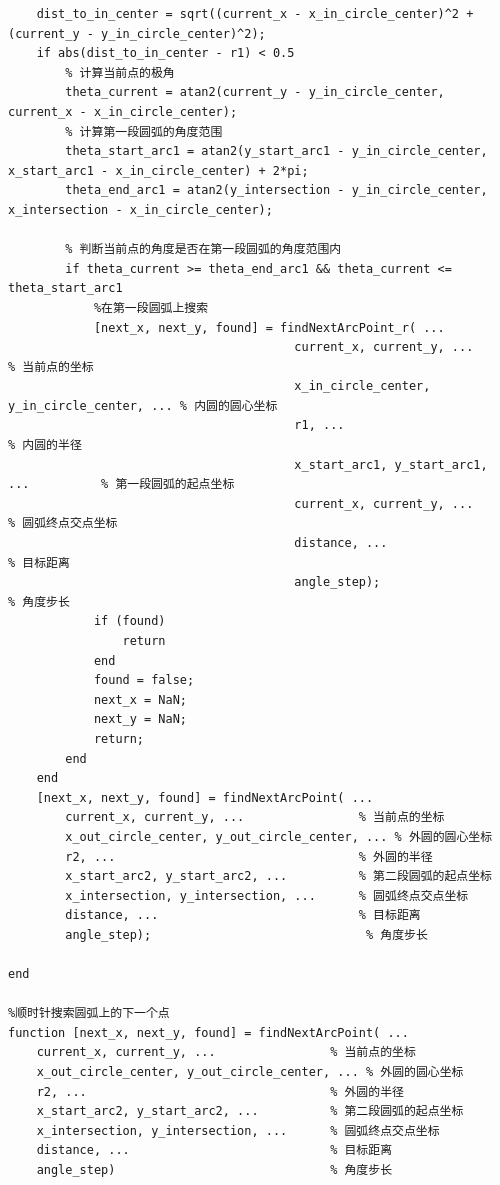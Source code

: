 \documentclass{cumcmthesis1}
\begin{document}
\begin{lstlisting}[caption={求解问题4中-100s到100s位置和速度的代码，并将计算结果保存到result4.xlsx中}, label={lst:eighth_code}]
    % 2. 检查当前点是否位于第一段圆弧上
    dist_to_in_center = sqrt((current_x - x_in_circle_center)^2 + (current_y - y_in_circle_center)^2);
    if abs(dist_to_in_center - r1) < 0.5
        % 计算当前点的极角
        theta_current = atan2(current_y - y_in_circle_center, current_x - x_in_circle_center);
        % 计算第一段圆弧的角度范围
        theta_start_arc1 = atan2(y_start_arc1 - y_in_circle_center, x_start_arc1 - x_in_circle_center) + 2*pi;
        theta_end_arc1 = atan2(y_intersection - y_in_circle_center, x_intersection - x_in_circle_center);

        % 判断当前点的角度是否在第一段圆弧的角度范围内
        if theta_current >= theta_end_arc1 && theta_current <= theta_start_arc1
            %在第一段圆弧上搜索
            [next_x, next_y, found] = findNextArcPoint_r( ...
                                        current_x, current_y, ...                % 当前点的坐标
                                        x_in_circle_center, y_in_circle_center, ... % 内圆的圆心坐标
                                        r1, ...                                  % 内圆的半径
                                        x_start_arc1, y_start_arc1, ...          % 第一段圆弧的起点坐标
                                        current_x, current_y, ...      % 圆弧终点交点坐标
                                        distance, ...                            % 目标距离
                                        angle_step);                              % 角度步长
            if (found)
                return
            end
            found = false;
            next_x = NaN;
            next_y = NaN;
            return;
        end
    end
    [next_x, next_y, found] = findNextArcPoint( ...
        current_x, current_y, ...                % 当前点的坐标
        x_out_circle_center, y_out_circle_center, ... % 外圆的圆心坐标
        r2, ...                                  % 外圆的半径
        x_start_arc2, y_start_arc2, ...          % 第二段圆弧的起点坐标
        x_intersection, y_intersection, ...      % 圆弧终点交点坐标
        distance, ...                            % 目标距离
        angle_step);                              % 角度步长

end

%顺时针搜索圆弧上的下一个点
function [next_x, next_y, found] = findNextArcPoint( ...
    current_x, current_y, ...                % 当前点的坐标
    x_out_circle_center, y_out_circle_center, ... % 外圆的圆心坐标
    r2, ...                                  % 外圆的半径
    x_start_arc2, y_start_arc2, ...          % 第二段圆弧的起点坐标
    x_intersection, y_intersection, ...      % 圆弧终点交点坐标
    distance, ...                            % 目标距离
    angle_step)                              % 角度步长


\end{lstlisting}
\end{document}
